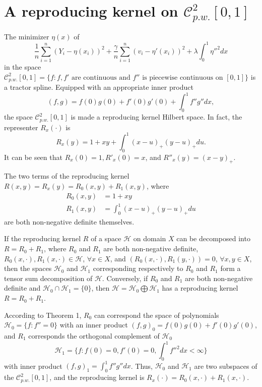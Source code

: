 \section{A reproducing kernel on $\mathcal{C}_{p.w.}^{2}[0,1]$}
The minimizer $\eta(x)$ of
\begin{equation}\label{maineq}
\frac{1}{n}\sum_{i=1}^{n}(Y_i-\eta(x_i))^2+\frac{\gamma}{n}\sum_{i=1}^{n}(v_i-\eta'(x_i))^2+\lambda \int_{0}^{1}\eta''^2dx
\end{equation}
in the space $\mathcal{C}_{p.w.}^{2}[0,1]=\{f:f,f' \mbox{ are continuous and } f'' \mbox{ is piecewise continuous on } [0,1] \}$ is a tractor spline. Equipped with an appropriate inner product
\begin{equation}
(f,g)=f(0) g(0)+f'(0) g'(0)+\int_{0}^{1}f''g''dx,
\end{equation}
the space $\mathcal{C}_{p.w.}^{2}[0,1]$ is made a reproducing kernel Hilbert space. In fact, the representer $R_x(\cdot)$ is 
\begin{equation}\label{kerneleq}
R_x(y)=1+xy+\int_{0}^{1} (x-u)_+(y-u)_+du.
\end{equation}
It can be seen that $R_x(0)=1, R'_x(0)=x$, and $R''_x(y)=(x-y)_+$.

The two terms of the reproducing kernel $R(x,y)=R_x(y)=R_0(x,y)+R_1(x,y)$, where
\begin{align}
R_0(x,y)&=1+xy \\
R_1(x,y)&=\int_{0}^{1} (x-u)_+(y-u)_+du
\end{align}
are both non-negative definite themselves.

\begin{theorem}
	If the reproducing kernel $R$ of a space $\mathcal{H}$ on domain $X$ can be decomposed into $R = R_0+R_1$, where $R_0$ and $R_1$ are both non-negative definite, $R_0(x,\cdot), R_1(x,\cdot) \in \mathcal{H}$, $\forall x \in X$, and $(R_0(x, ·),R_1(y, ·)) = 0$, $\forall x, y \in X$, then the spaces $\mathcal{H}_0$ and $\mathcal{H}_1$ corresponding respectively to $R_0$ and $R_1$ form a tensor sum decomposition of $\mathcal{H}$. Conversely, if $R_0$ and $R_1$ are both non-negative definite and $\mathcal{H}_0 \cap \mathcal{H}_1 = \{ 0 \}$, then $\mathcal{H} = \mathcal{H}_0 \bigoplus \mathcal{H}_1$ has a reproducing kernel $R = R_0 + R_1$.
\end{theorem}

According to Theorem 1, $R_0$ can correspond the space of polynomials $\mathcal{H}_0=\{f:f''=0\}$ with an inner product $(f,g)_0= f(0)g(0)+f'(0)g'(0)$, and $R_1$ corresponds the orthogonal complement of $\mathcal{H}_0$
\begin{equation*}
\mathcal{H}_1=\{f:f(0)=0, f'(0)=0, \int_{0}^{1}f''^2dx<\infty\}
\end{equation*}
with inner product $(f,g)_1=\int_{0}^{1}f''g''dx$. Thus, $\mathcal{H}_0$ and $\mathcal{H}_1$ are two subspaces of the $\mathcal{C}_{p.w.}^{2}[0,1]$, and the reproducing kernel is $R_x(\cdot) = R_0(x,\cdot)+R_1(x,\cdot)$.

